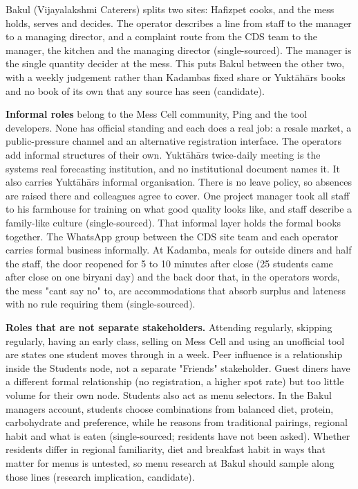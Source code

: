 \documentclass[
  10pt,
  table]{article}
\begin{document}
Bakul (Vijayalakshmi Caterers) splits two sites: Hafizpet cooks, and the mess holds, serves and decides. The operator describes a line from staff to the manager to a managing director, and a complaint route from the CDS team to the manager, the kitchen and the managing director (single-sourced). The manager is the single quantity decider at the mess. This puts Bakul between the other two, with a weekly judgement rather than Kadamba\textquotesingle s fixed share or Yuktāhār\textquotesingle s books and no book of its own that any source has seen (candidate).

\textbf{Informal roles} belong to the Mess Cell community, Ping and the tool developers. None has official standing and each does a real job: a resale market, a public-pressure channel and an alternative registration interface. The operators add informal structures of their own. Yuktāhār\textquotesingle s twice-daily meeting is the system\textquotesingle s real forecasting institution, and no institutional document names it. It also carries Yuktāhār\textquotesingle s informal organisation. There is no leave policy, so absences are raised there and colleagues agree to cover. One project manager took all staff to his farmhouse for training on what good quality looks like, and staff describe a family-like culture (single-sourced). That informal layer holds the formal books together. The WhatsApp group between the CDS site team and each operator carries formal business informally. At Kadamba, meals for outside diners and half the staff, the door reopened for 5 to 10 minutes after close (25 students came after close on one biryani day) and the back door that, in the operator\textquotesingle s words, the mess "can\textquotesingle t say no" to, are accommodations that absorb surplus and lateness with no rule requiring them (single-sourced).

\textbf{Roles that are not separate stakeholders.} Attending regularly, skipping regularly, having an early class, selling on Mess Cell and using an unofficial tool are states one student moves through in a week. Peer influence is a relationship inside the Students node, not a separate "Friends" stakeholder. Guest diners have a different formal relationship (no registration, a higher spot rate) but too little volume for their own node. Students also act as menu selectors. In the Bakul manager\textquotesingle s account, students choose combinations from balanced diet, protein, carbohydrate and preference, while he reasons from traditional pairings, regional habit and what is eaten (single-sourced; residents have not been asked). Whether residents differ in regional familiarity, diet and breakfast habit in ways that matter for menus is untested, so menu research at Bakul should sample along those lines (research implication, candidate).
\end{document}
